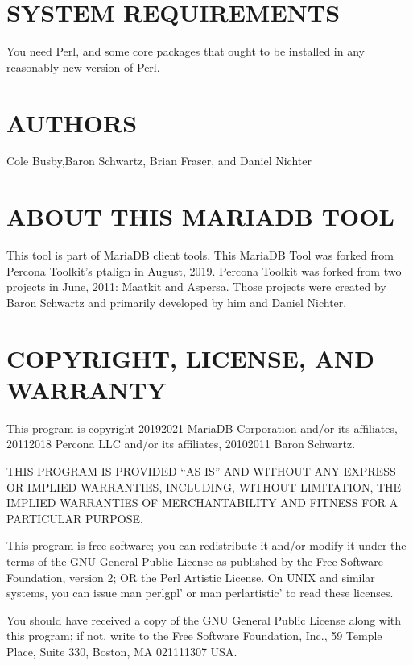 \documentclass[letterpaper,10pt,english]{sphinxmanual}
\begin{document}
\section{SYSTEM REQUIREMENTS}
\label{\detokenize{mariadb-align-output:system-requirements}}
\sphinxAtStartPar
You need Perl, and some core packages that ought to be installed in any
reasonably new version of Perl.


\section{AUTHORS}
\label{\detokenize{mariadb-align-output:authors}}
\sphinxAtStartPar
Cole Busby,Baron Schwartz, Brian Fraser, and Daniel Nichter


\section{ABOUT THIS MARIADB TOOL}
\label{\detokenize{mariadb-align-output:about-this-mariadb-tool}}
\sphinxAtStartPar
This tool is part of MariaDB client tools. This MariaDB Tool was forked from
Percona Toolkit’s pt\sphinxhyphen{}align in August, 2019. Percona Toolkit was forked from two
projects in June, 2011: Maatkit and Aspersa.  Those projects were created by
Baron Schwartz and primarily developed by him and Daniel Nichter.


\section{COPYRIGHT, LICENSE, AND WARRANTY}
\label{\detokenize{mariadb-align-output:copyright-license-and-warranty}}
\sphinxAtStartPar
This program is copyright 2019\sphinxhyphen{}2021 MariaDB Corporation and/or its affiliates,
2011\sphinxhyphen{}2018 Percona LLC and/or its affiliates, 2010\sphinxhyphen{}2011 Baron Schwartz.

\sphinxAtStartPar
THIS PROGRAM IS PROVIDED “AS IS” AND WITHOUT ANY EXPRESS OR IMPLIED
WARRANTIES, INCLUDING, WITHOUT LIMITATION, THE IMPLIED WARRANTIES OF
MERCHANTABILITY AND FITNESS FOR A PARTICULAR PURPOSE.

\sphinxAtStartPar
This program is free software; you can redistribute it and/or modify it under
the terms of the GNU General Public License as published by the Free Software
Foundation, version 2; OR the Perl Artistic License.  On UNIX and similar
systems, you can issue \textasciigrave{}man perlgpl’ or \textasciigrave{}man perlartistic’ to read these
licenses.

\sphinxAtStartPar
You should have received a copy of the GNU General Public License along with
this program; if not, write to the Free Software Foundation, Inc., 59 Temple
Place, Suite 330, Boston, MA  02111\sphinxhyphen{}1307  USA.
\end{document}
